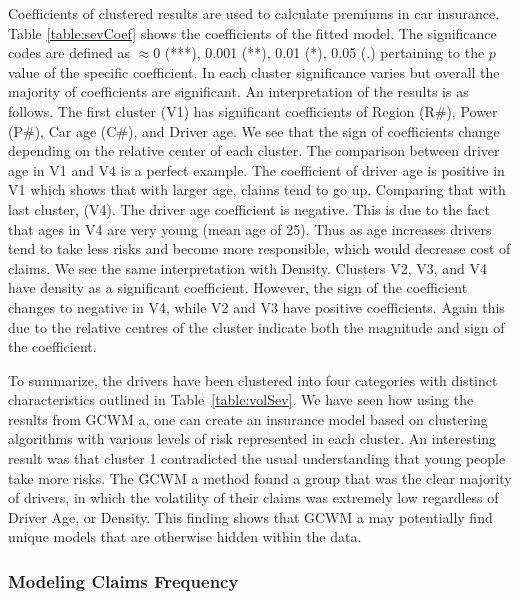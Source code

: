 \documentclass[11pt,letterpaper]{article}
\numberwithin{equation}{section}
\numberwithin{equation}{section}
\numberwithin{equation}{section}
\begin{document}
Coefficients of clustered results are used to calculate premiums in car insurance. Table  \ref{table:sevCoef} shows the coefficients of the fitted model. The significance codes are defined as $\approx 0$  (***), 0.001 (**), 0.01 (*), 0.05 (.) %
pertaining to the $p$ value of the specific coefficient. In each cluster significance varies but overall the majority of coefficients are significant. An interpretation of the results is as follows. The first cluster (V1) has significant coefficients of Region (R\#),  Power (P\#), Car age (C\#), and Driver age. We see that the sign of coefficients change depending on the relative center of each cluster. The comparison between driver age in V1 and V4 is a perfect example. The coefficient of driver age is positive in V1 which shows that with larger age, claims tend to go up. Comparing that with last cluster, (V4). The driver age coefficient is negative. This is due to the fact that ages in V4 are very young (mean age of 25). Thus as age increases drivers tend to take less risks and become more responsible, which would decrease cost of claims. We see the same interpretation with Density. Clusters V2, V3, and V4  have density as a significant coefficient. However, the sign of the coefficient changes to negative in V4, while V2 and V3 have positive coefficients. Again this due to the relative centres of the cluster indicate both the magnitude and sign of the coefficient.%

To summarize, the drivers have been clustered into four categories with distinct characteristics outlined in Table~\ref{table:volSev}. We have seen how using the results from GCWM a, one can create an insurance model based on clustering algorithms with various levels of risk represented in each cluster. An interesting result was that cluster 1 contradicted the usual understanding that young people take more risks. %
The GCWM a method found a group that was the clear majority of drivers, in which the volatility of their claims was extremely low regardless of Driver Age, or Density. This finding shows that GCWM a may potentially find unique models that are otherwise hidden within the data.


 \subsubsection{Modeling Claims Frequency}
\end{document}
